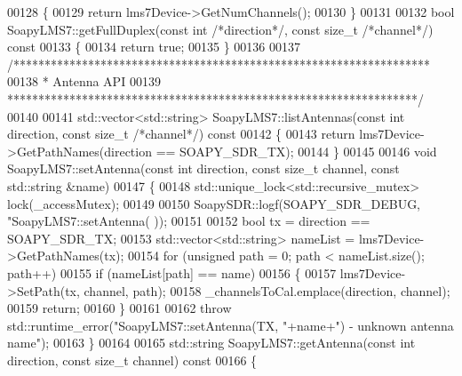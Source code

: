 \begin{DoxyCode}
{{{{{00128 \textcolor{keyword}{}\{
00129     \textcolor{keywordflow}{return} lms7Device->GetNumChannels();
00130 \}
00131 
00132 \textcolor{keywordtype}{bool} SoapyLMS7::getFullDuplex(\textcolor{keyword}{const} \textcolor{keywordtype}{int} \textcolor{comment}{/*direction*/}, \textcolor{keyword}{const} \textcolor{keywordtype}{size\_t} \textcolor{comment}{/*channel*/})\textcolor{keyword}{ const}
00133 \textcolor{keyword}{}\{
00134     \textcolor{keywordflow}{return} \textcolor{keyword}{true};
00135 \}
00136 
00137 \textcolor{comment}{/*******************************************************************}
00138 \textcolor{comment}{ * Antenna API}
00139 \textcolor{comment}{ ******************************************************************/}
00140 
00141 std::vector<std::string> SoapyLMS7::listAntennas(\textcolor{keyword}{const} \textcolor{keywordtype}{int} direction, \textcolor{keyword}{const} \textcolor{keywordtype}{size\_t} \textcolor{comment}{/*channel*/})\textcolor{keyword}{ const}
00142 \textcolor{keyword}{}\{
00143     \textcolor{keywordflow}{return} lms7Device->GetPathNames(direction == SOAPY_SDR_TX);
00144 \}
00145 
00146 \textcolor{keywordtype}{void} SoapyLMS7::setAntenna(\textcolor{keyword}{const} \textcolor{keywordtype}{int} direction, \textcolor{keyword}{const} \textcolor{keywordtype}{size\_t} channel, \textcolor{keyword}{const} 
      std::string &name)
00147 \{
00148     std::unique\_lock<std::recursive\_mutex> lock(_accessMutex);
00149 
00150     SoapySDR::logf(SOAPY_SDR_DEBUG, \textcolor{stringliteral}{"SoapyLMS7::setAntenna(%
      ));
00151 
00152     \textcolor{keywordtype}{bool} tx = direction == SOAPY_SDR_TX;
00153     std::vector<std::string> nameList = lms7Device->GetPathNames(tx);
00154     \textcolor{keywordflow}{for} (\textcolor{keywordtype}{unsigned} path = 0; path < nameList.size(); path++)
00155         \textcolor{keywordflow}{if} (nameList[path] == name)
00156         \{
00157             lms7Device->SetPath(tx, channel, path);
00158             _channelsToCal.emplace(direction, channel);
00159             \textcolor{keywordflow}{return};
00160         \}
00161 
00162     \textcolor{keywordflow}{throw} std::runtime\_error(\textcolor{stringliteral}{"SoapyLMS7::setAntenna(TX, "}+name+\textcolor{stringliteral}{") - unknown antenna name"});
00163 \}
00164 
00165 std::string SoapyLMS7::getAntenna(\textcolor{keyword}{const} \textcolor{keywordtype}{int} direction, \textcolor{keyword}{const} \textcolor{keywordtype}{size\_t} channel)\textcolor{keyword}{ const}
00166 \textcolor{keyword}{}\{
}}}}}}
\end{DoxyCode}
